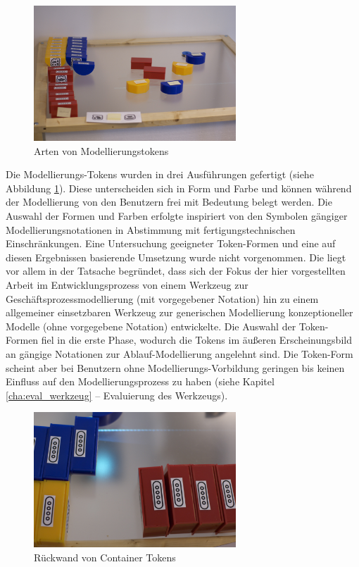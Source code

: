 \begin{figure}[htbp]
	\centering
		\includegraphics[height=2in]{img/ImplementierungInput/TokenTypes.jpg}
	\caption{Arten von Modellierungstokens}
	\label{fig:img_ImplementierungInput_TokenTypes}
\end{figure}


Die Modellierungs-Tokens wurden in drei Ausführungen gefertigt (siehe Abbildung \ref{fig:img_ImplementierungInput_TokenTypes}). Diese unterscheiden sich in Form und Farbe und können während der Modellierung von den Benutzern frei mit Bedeutung belegt werden. Die Auswahl der Formen und Farben erfolgte inspiriert von den Symbolen gängiger Modellierungsnotationen in Abstimmung mit fertigungstechnischen Einschränkungen. Eine Untersuchung geeigneter Token-Formen und eine auf diesen Ergebnissen basierende Umsetzung wurde nicht vorgenommen. Die liegt vor allem in der Tatsache begründet, dass sich der Fokus der hier vorgestellten Arbeit im Entwicklungsprozess von einem Werkzeug zur Geschäftsprozessmodellierung (mit vorgegebener Notation) hin zu einem allgemeiner einsetzbaren Werkzeug zur generischen Modellierung konzeptioneller Modelle (ohne vorgegebene Notation) entwickelte. Die Auswahl der Token-Formen fiel in die erste Phase, wodurch die Tokens im äußeren Erscheinungsbild an gängige Notationen zur Ablauf-Modellierung angelehnt sind. Die Token-Form scheint aber bei Benutzern ohne Modellierungs-Vorbildung geringen bis keinen Einfluss auf den Modellierungsprozess zu haben (siehe Kapitel \ref{cha:eval_werkzeug} -- Evaluierung des Werkzeugs).

\begin{figure}[htbp]
	\centering
		\includegraphics[height=2in]{img/ImplementierungInput/ContainerRueckseite.jpg}
	\caption{Rückwand von Container Tokens}
	\label{fig:img_ImplementierungInput_ContainerRueckseite}
\end{figure}

